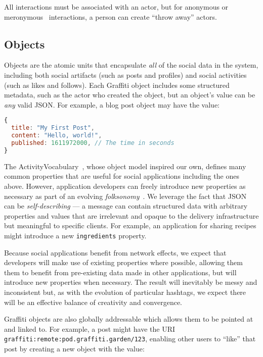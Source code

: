 All interactions must be associated with an actor, but
for anonymous or meronymous~\cite{meronymous} interactions,
a person can create ``throw away'' actors.

\subsection{Objects}
\label{concepts:objects}

Objects are the atomic units that encapsulate \emph{all}
of the social data in the system, including
both social artifacts (such as posts and profiles) and social activities (such as likes and follows).
Each Graffiti object includes some structured metadata,
such as the actor who created the object,
but an object's value can be \emph{any} valid JSON.
For example, a blog post object may have the value:

\begin{lstlisting}[language=javascript]
{
  title: "My First Post",
  content: "Hello, world!",
  published: 1611972000, // The time in seconds
}
\end{lstlisting}

The ActivityVocabulary~\cite{activityvocab},
whose object model inspired our own,
defines many common properties that are useful for social applications including
the ones above.
However, application developers can freely introduce new properties as necessary
as part of an evolving \emph{folksonomy}~\cite{folksonomy}.
We leverage the fact that JSON can be \emph{self-describing}
--- a message can contain structured data with arbitrary properties and
values that are irrelevant and opaque to the delivery infrastructure but
meaningful to specific clients.
For example, an application for sharing recipes might introduce a new
\texttt{ingredients} property.

Because social applications
benefit from network effects, we expect that developers will make use of
existing properties where possible, allowing them them to benefit from pre-existing data
made in other applications, but will introduce new properties when necessary.
The result will inevitably be messy and inconsistent but, as with the evolution of
particular hashtags, we expect there will be an effective balance of creativity and convergence.

Graffiti objects are also globally addressable which allows them to be
pointed at and linked to.
For example, a post might have the URI \texttt{graffiti:remote:pod.graffiti.garden/123},
enabling other users to ``like'' that post by creating a new object with the value:


